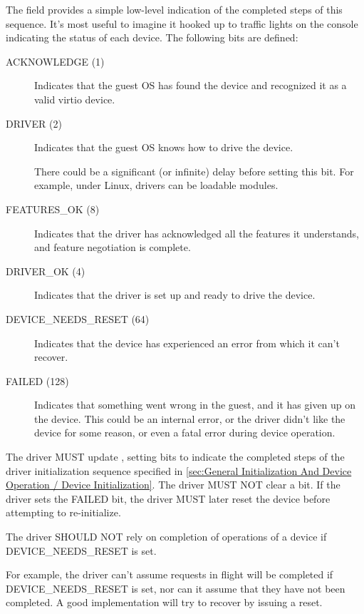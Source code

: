 The  field provides a simple low-level
indication of the completed steps of this sequence.
It's most useful to imagine it hooked up to traffic
lights on the console indicating the status of each device.  The
following bits are defined:
\begin{description}
\item[ACKNOWLEDGE (1)] Indicates that the guest OS has found the
  device and recognized it as a valid virtio device.

\item[DRIVER (2)] Indicates that the guest OS knows how to drive the
  device.
  \begin{note}
    There could be a significant (or infinite) delay before setting
    this bit.  For example, under Linux, drivers can be loadable modules.
  \end{note}

\item[FEATURES_OK (8)] Indicates that the driver has acknowledged all the
  features it understands, and feature negotiation is complete.

\item[DRIVER_OK (4)] Indicates that the driver is set up and ready to
  drive the device.

\item[DEVICE_NEEDS_RESET (64)] Indicates that the device has experienced
  an error from which it can't recover.

\item[FAILED (128)] Indicates that something went wrong in the guest,
  and it has given up on the device. This could be an internal
  error, or the driver didn't like the device for some reason, or
  even a fatal error during device operation.
\end{description}

The driver MUST update ,
setting bits to indicate the completed steps of the driver
initialization sequence specified in
\ref{sec:General Initialization And Device Operation / Device
Initialization}.
The driver MUST NOT clear a
 bit.  If the driver sets the FAILED bit,
the driver MUST later reset the device before attempting to re-initialize.

The driver SHOULD NOT rely on completion of operations of a
device if DEVICE_NEEDS_RESET is set.
\begin{note}
For example, the driver can't assume requests in flight will be
completed if DEVICE_NEEDS_RESET is set, nor can it assume that
they have not been completed.  A good implementation will try to
recover by issuing a reset.
\end{note}

